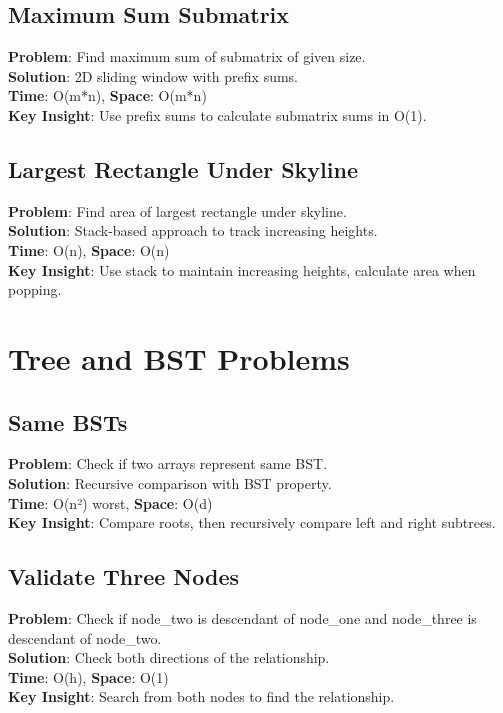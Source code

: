 \documentclass{report}
\begin{document}
\subsection{Maximum Sum Submatrix}
\textbf{Problem}: Find maximum sum of submatrix of given size.\\
\textbf{Solution}: 2D sliding window with prefix sums.\\
\textbf{Time}: O(m*n), \textbf{Space}: O(m*n)\\
\textbf{Key Insight}: Use prefix sums to calculate submatrix sums in O(1).

\subsection{Largest Rectangle Under Skyline}
\textbf{Problem}: Find area of largest rectangle under skyline.\\
\textbf{Solution}: Stack-based approach to track increasing heights.\\
\textbf{Time}: O(n), \textbf{Space}: O(n)\\
\textbf{Key Insight}: Use stack to maintain increasing heights, calculate area when popping.

\section{Tree and BST Problems}

\subsection{Same BSTs}
\textbf{Problem}: Check if two arrays represent same BST.\\
\textbf{Solution}: Recursive comparison with BST property.\\
\textbf{Time}: O(n²) worst, \textbf{Space}: O(d)\\
\textbf{Key Insight}: Compare roots, then recursively compare left and right subtrees.

\subsection{Validate Three Nodes}
\textbf{Problem}: Check if node\_two is descendant of node\_one and node\_three is descendant of node\_two.\\
\textbf{Solution}: Check both directions of the relationship.\\
\textbf{Time}: O(h), \textbf{Space}: O(1)\\
\textbf{Key Insight}: Search from both nodes to find the relationship.
\end{document}
